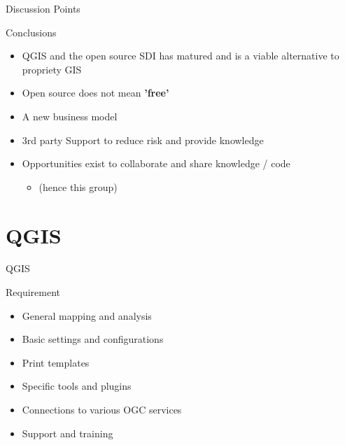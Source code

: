 \begin{frame}{Discussion Points}
	\begin{block}{Conclusions}
		\begin{itemize}
			\item QGIS and the open source SDI has matured and is a viable alternative to propriety GIS
			
			
			\item Open source does not mean \textbf{'free'}
						
			\item A new business model
			
			
			\item 3rd party Support to reduce risk and provide knowledge
			
			
			\item Opportunities exist to collaborate and share knowledge / code
				\begin{itemize}
					\item  (hence this group)
				\end{itemize}
						
			
		\end{itemize}
	\end{block}
\end{frame}




\section{QGIS}


\begin{frame}{QGIS}
		\begin{block}{Requirement}
			\begin{itemize}
				\item General mapping and analysis
				\item Basic settings and configurations
				\item Print templates
				\item Specific tools and plugins 
				\item Connections to various OGC services
				\item Support and training
			\end{itemize}
		\end{block}
\end{frame}


